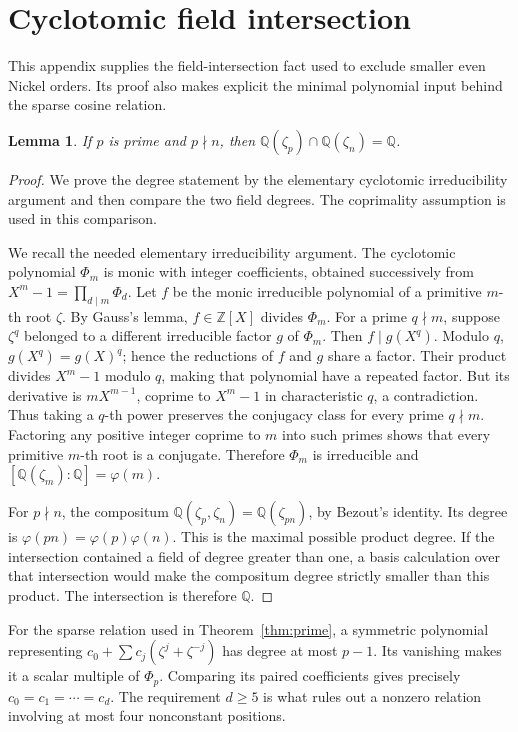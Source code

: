 \documentclass[11pt]{article}
\numberwithin{equation}{section}
\newtheorem{lemma}[theorem]{Lemma}
\theoremstyle{definition}
\newcommand{\Q}{\mathbb Q}
\newcommand{\Z}{\mathbb Z}
\begin{document}
\appendix

\section{Cyclotomic field intersection}

This appendix supplies the field-intersection fact used to exclude
smaller even Nickel orders. Its proof also makes explicit the minimal
polynomial input behind the sparse cosine relation.
\begin{lemma}\label{lem:cyclotomic}
If \(p\) is prime and \(p\nmid n\), then
\(\Q(\zeta_p)\cap\Q(\zeta_n)=\Q\).
\end{lemma}
\begin{proof}
We prove the degree statement by the elementary cyclotomic irreducibility argument and then compare the two field degrees. The coprimality assumption is used in this comparison.

We recall the needed elementary irreducibility argument.
The cyclotomic polynomial \(\Phi_m\) is monic with integer
coefficients, obtained successively from \(X^m-1=\prod_{d\mid m}\Phi_d\).
Let \(f\) be the monic irreducible polynomial of a primitive \(m\)-th
root \(\zeta\). By Gauss's lemma, \(f\in\Z[X]\) divides \(\Phi_m\).
For a prime \(q\nmid m\), suppose \(\zeta^q\) belonged to a different
irreducible factor \(g\) of \(\Phi_m\). Then \(f\mid g(X^q)\).
Modulo \(q\), \(g(X^q)=g(X)^q\); hence the reductions of \(f\)
and \(g\) share a factor. Their product divides \(X^m-1\) modulo
\(q\), making that polynomial have a repeated factor.
But its derivative is \(mX^{m-1}\), coprime to \(X^m-1\)
in characteristic \(q\), a contradiction.
Thus taking a \(q\)-th power preserves the conjugacy class for
every prime \(q\nmid m\). Factoring any positive integer coprime
to \(m\) into such primes shows that every primitive \(m\)-th
root is a conjugate. Therefore \(\Phi_m\) is irreducible and
\([\Q(\zeta_m):\Q]=\varphi(m)\).

For \(p\nmid n\), the compositum
\(\Q(\zeta_p,\zeta_n)=\Q(\zeta_{pn})\), by Bezout's identity.
Its degree is
\(\varphi(pn)=\varphi(p)\varphi(n)\).
This is the maximal possible product degree. If the intersection
contained a field of degree greater than one, a basis calculation
over that intersection would make the compositum degree strictly
smaller than this product. The intersection is therefore \(\Q\).
\end{proof}

For the sparse relation used in Theorem~\ref{thm:prime}, a symmetric
polynomial representing \(c_0+\sum c_j(\zeta^j+\zeta^{-j})\) has
degree at most \(p-1\). Its vanishing makes it a scalar multiple
of \(\Phi_p\). Comparing its paired coefficients gives precisely
\(c_0=c_1=\cdots=c_d\). The requirement \(d\ge5\) is what rules
out a nonzero relation involving at most four nonconstant positions.
\end{document}
